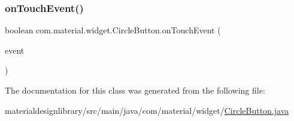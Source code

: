 \subsubsection{\texorpdfstring{on\+Touch\+Event()}{onTouchEvent()}}
{\footnotesize\ttfamily boolean com.\+material.\+widget.\+Circle\+Button.\+on\+Touch\+Event (\begin{DoxyParamCaption}\item[{@Non\+Null Motion\+Event}]{event }\end{DoxyParamCaption})}



The documentation for this class was generated from the following file\+:\begin{DoxyCompactItemize}
\item 
materialdesignlibrary/src/main/java/com/material/widget/\hyperlink{_circle_button_8java}{Circle\+Button.\+java}\end{DoxyCompactItemize}
